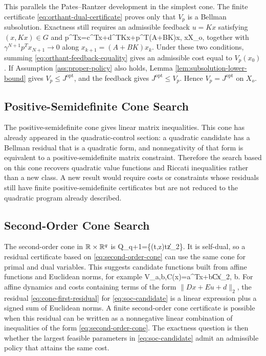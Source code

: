 \documentclass{article}
\begin{document}
This parallels the Pates--Rantzer development in the simplest cone. The finite certificate \eqref{eq:orthant-dual-certificate} proves only that $V_p$ is a Bellman subsolution. Exactness still requires an admissible feedback $u=Kx$ satisfying $(x,Kx)\in G$ and
\BEQ
p^Tx=c^Tx+d^TKx+\gamma p^T(A+BK)x,
\quad x\in X_o,
\label{eq:orthant-feedback-equality}
\EEQ
together with $\gamma^{N+1}p^Tx_{N+1}\rightarrow0$ along $x_{k+1}=(A+BK)x_k$. Under these two conditions, summing \eqref{eq:orthant-feedback-equality} gives an admissible cost equal to $V_p(x_0)$. If Assumption \ref{ass:proper-policy} also holds, Lemma \ref{lem:subsolution-lower-bound} gives $V_p\leq J^\textrm{opt}$, and the feedback gives $J^\textrm{opt}\leq V_p$. Hence $V_p=J^\textrm{opt}$ on $X_o$.

\subsection{Positive-Semidefinite Cone Search}

The positive-semidefinite cone gives linear matrix inequalities. This cone has already appeared in the quadratic-control section: a quadratic candidate has a Bellman residual that is a quadratic form, and nonnegativity of that form is equivalent to a positive-semidefinite matrix constraint. Therefore the search based on this cone recovers quadratic value functions and Riccati inequalities rather than a new class. A new result would require costs or constraints whose residuals still have finite positive-semidefinite certificates but are not reduced to the quadratic program already described.

\subsection{Second-Order Cone Search}

The second-order cone in $\mathbb{R}\times\mathbb{R}^q$ is
\BEQ
\mathcal Q_{q+1}=\{(t,z)\mid t\geq \|z\|_2\}.
\label{eq:second-order-cone}
\EEQ
It is self-dual, so a residual certificate based on \eqref{eq:second-order-cone} can use the same cone for primal and dual variables. This suggests candidate functions built from affine functions and Euclidean norms, for example
\BEQ
V_{a,b,C}(x)=a^Tx+b\|Cx\|_2,
\quad b.
\label{eq:soc-candidate}
\EEQ
For affine dynamics and costs containing terms of the form $\|D x+E u+d\|_2$, the residual \eqref{eq:cone-first-residual} for \eqref{eq:soc-candidate} is a linear expression plus a signed sum of Euclidean norms. A finite second-order cone certificate is possible when this residual can be written as a nonnegative linear combination of inequalities of the form \eqref{eq:second-order-cone}. The exactness question is then whether the largest feasible parameters in \eqref{eq:soc-candidate} admit an admissible policy that attains the same cost.
\end{document}
